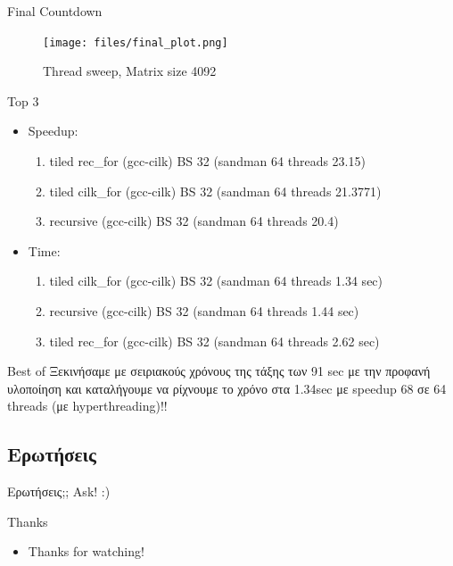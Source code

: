 \documentclass{beamer}
\begin{document}
\begin{frame}
    \begin{block}{Final Countdown}
        \begin{figure}[H]
            \centering
            \texttt{[image: files/final\_plot.png]}
            \caption{Thread sweep, Matrix size 4092}
        \end{figure}
    \end{block}
\end{frame}

\begin{frame}
    \begin{block}{Top 3}
    \begin{itemize}
        \item<1-> Speedup:
            \begin{enumerate}
                \item<2-> tiled rec\_for (gcc-cilk) BS 32 (sandman 64 threads 23.15)
                \item<3-> tiled cilk\_for (gcc-cilk) BS 32 (sandman 64 threads 21.3771)
                \item<4-> recursive (gcc-cilk) BS 32 (sandman 64 threads 20.4)
            \end{enumerate}
        \item<5-> Time:
            \begin{enumerate}
                \item<6-> tiled cilk\_for (gcc-cilk) BS 32 (sandman 64 threads 1.34 sec)
                \item<7-> recursive (gcc-cilk) BS 32 (sandman 64 threads 1.44 sec)
                \item<8-> tiled rec\_for (gcc-cilk) BS 32 (sandman 64 threads 2.62 sec)
            \end{enumerate}
    \end{itemize}
    \end{block}
\end{frame}

\begin{frame}
    \begin{block}{Best of}
        Ξεκινήσαμε με σειριακούς χρόνους της τάξης των 91 sec με την προφανή
        υλοποίηση και καταλήγουμε να ρίχνουμε το χρόνο στα 1.34sec με speedup
        68 σε 64 threads (με hyperthreading)!! \smiley{}
    \end{block}
\end{frame}


\subsection{Ερωτήσεις}
\begin{frame}{Ερωτήσεις;;}
    Ask! :)
\end{frame}

\begin{frame}{Thanks}
    \begin{itemize}
        \item Thanks for watching!
    \end{itemize}
\end{frame}
\end{document}
